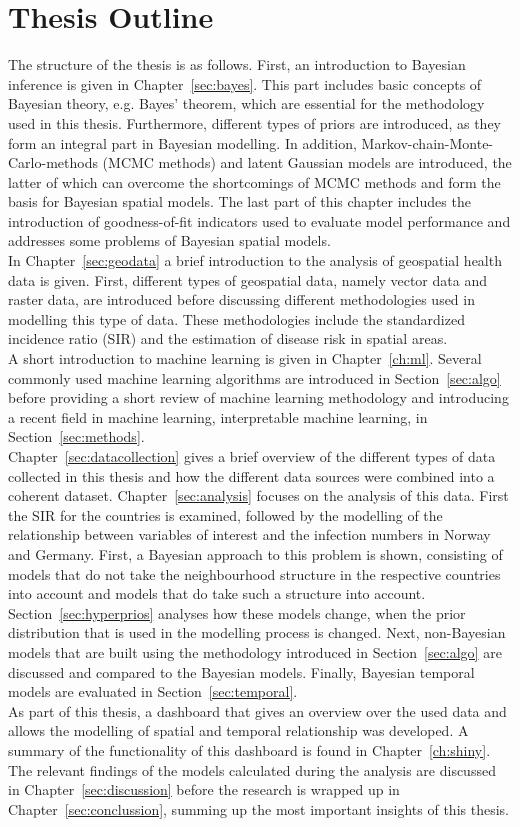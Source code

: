 \section{Thesis Outline}
The structure of the thesis is as follows. First, an introduction to Bayesian inference is given in Chapter~\ref{sec:bayes}. This part includes basic concepts of Bayesian theory, e.g. Bayes' theorem, which are essential for the methodology used in this thesis. Furthermore, different types of priors are introduced, as they form an integral part in Bayesian modelling. In addition, Markov-chain-Monte-Carlo-methods (MCMC methods) and latent Gaussian models are introduced, the latter of which can overcome the shortcomings of MCMC methods and form the basis for Bayesian spatial models. The last part of this chapter includes the introduction of goodness-of-fit indicators used to evaluate model performance and addresses some problems of Bayesian spatial models. \\
In Chapter~\ref{sec:geodata} a brief introduction to the analysis of geospatial health data is given. First, different types of geospatial data, namely vector data and raster data, are introduced before discussing different methodologies used in modelling this type of data. These methodologies include the standardized incidence ratio (SIR) and the estimation of disease risk in spatial areas. \\
A short introduction to machine learning is given in Chapter~\ref{ch:ml}. Several commonly used machine learning algorithms are introduced in Section~\ref{sec:algo} before providing a short review of machine learning methodology and introducing a recent field in machine learning, interpretable machine learning, in Section~\ref{sec:methods}. \\
Chapter~\ref{sec:datacollection} gives a brief overview of the different types of data collected in this thesis and how the different data sources were combined into a coherent dataset. 
Chapter~\ref{sec:analysis} focuses on the analysis of this data. First the SIR for the countries is examined, followed by the modelling of the relationship between variables of interest and the infection numbers in Norway and Germany. First, a Bayesian approach to this problem is shown, consisting of models that do not take the neighbourhood structure in the respective countries into account and models that do take such a structure into account. Section~\ref{sec:hyperprios} analyses how these models change, when the prior distribution that is used in the modelling process is changed. Next, non-Bayesian models that are built using the methodology introduced in Section~\ref{sec:algo} are discussed and compared to the Bayesian models. Finally, Bayesian temporal models are evaluated in Section~\ref{sec:temporal}. \\
As part of this thesis, a dashboard that gives an overview over the used data and allows the modelling of spatial and temporal relationship was developed. A summary of the functionality of this dashboard is found in Chapter~\ref{ch:shiny}.
The relevant findings of the models calculated during the analysis are discussed in Chapter~\ref{sec:discussion} before the research is wrapped up in Chapter~\ref{sec:conclussion}, summing up the most important insights of this thesis.
